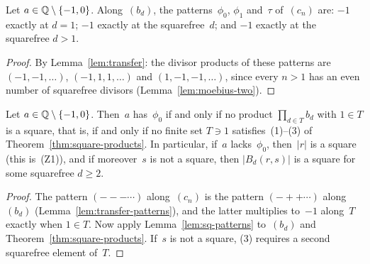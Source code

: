 \begin{lemma}
  \label{lem:transfer-patterns}
  \leanok
  Let $a \in \mathbb{Q} \setminus \{-1, 0\}$. Along~$(b_d)$, the patterns~$\phi_0$, $\phi_1$ and~$\tau$
  of~$(c_n)$ are: $-1$ exactly at $d = 1$; $-1$ exactly at the squarefree~$d$; and $-1$ exactly
  at the squarefree $d > 1$.
\end{lemma}
\begin{proof}
  \leanok
  By Lemma~\ref{lem:transfer}: the divisor products of these patterns are $(-1, -1, \dots)$,
  $(-1, 1, 1, \dots)$ and $(1, -1, -1, \dots)$, since every $n > 1$ has an even number of
  squarefree divisors (Lemma~\ref{lem:moebius-two}).
\end{proof}

\begin{corollary}
  \label{cor:phi0-exact}
  \leanok
  Let $a \in \mathbb{Q} \setminus \{-1, 0\}$. Then~$a$ has~$\phi_0$ if and only if no product
  $\prod_{d \in T} b_d$ with $1 \in T$ is a square, that is, if and only if no finite set
  $T \ni 1$ satisfies~(1)--(3) of Theorem~\ref{thm:square-products}. In particular, if~$a$
  lacks~$\phi_0$, then~$|r|$ is a square (this is~(Z1)), and if moreover~$s$ is not a square,
  then $|B_d(r, s)|$ is a square for some squarefree $d \ge 2$.
\end{corollary}
\begin{proof}
  \leanok
  The pattern $({-}{-}{-}\cdots)$ along~$(c_n)$ is the pattern $({-}{+}{+}\cdots)$
  along~$(b_d)$ (Lemma~\ref{lem:transfer-patterns}), and the latter multiplies to~$-1$ along~$T$ exactly
  when $1 \in T$. Now apply Lemma~\ref{lem:sq-patterns} to~$(b_d)$ and
  Theorem~\ref{thm:square-products}. If~$s$ is not a square, (3) requires a second squarefree
  element of~$T$.
\end{proof}

